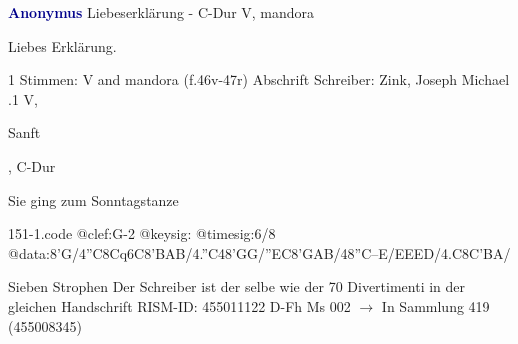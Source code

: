 \documentclass[twocolumn]{book}
\begin{document}
\newline \par \vspace{7pt} \textcolor{darkblue}{\textbf{Anonymus  }}
\newline Liebeserklärung - C-Dur
\newline V, mandora
\newline \begin{itshape}[heading, f.46v:] Liebes Erklärung.\end{itshape} 
\newline \textcolor{darkblue}{}  1 Stimmen: V and mandora  (f.46v-47r)
\newline Abschrift
\newline Schreiber: Zink, Joseph Michael
.1  V, \begin{itshape}Sanft\end{itshape}, C-Dur
\newline \begin{footnotesize} Sie ging zum Sonntagstanze \end{footnotesize}  
\begin{filecontents*}{151-1.code}
@clef:G-2
@keysig:
@timesig:6/8
@data:8'G/4''C8Cq6C{8'BA}B/4.''C48'GG/''EC{8'GA}B/48''C--E/EEED/4.C{8C'B}A/
\end{filecontents*}
\newline
%
\newline Sieben Strophen
\newline Der Schreiber ist der selbe wie der 70 Divertimenti in der gleichen Handschrift
\newline RISM-ID: 455011122
\newline D-Fh  Ms 002
\newline $\rightarrow$ In Sammlung 419 (455008345)
      
\end{document}
